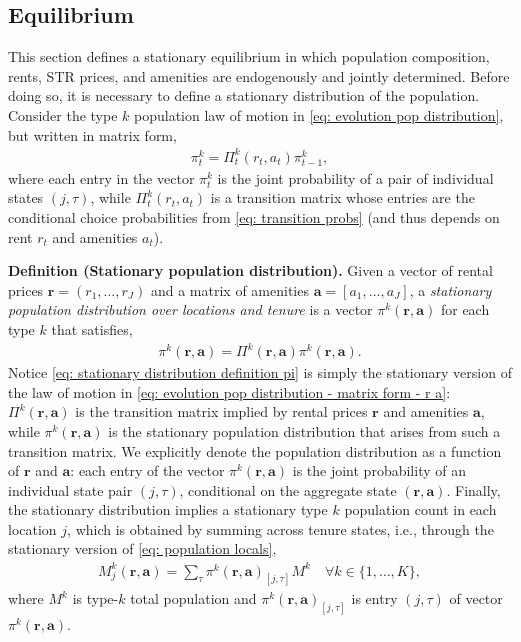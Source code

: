 \documentclass[11pt]{article}
\newcommand{\Paragraph}{\vspace{0.1cm}\noindent\textbf}
\begin{document}
\subsection{Equilibrium}\label{sec: equilibrium}

This section defines a stationary equilibrium in which population composition, rents, STR prices, and amenities are endogenously and jointly determined. Before doing so, it is necessary to define a stationary distribution of the population. Consider the type $k$ population law of motion in \ref{eq: evolution pop distribution}, but written in matrix form,
\begin{align}\label{eq: evolution pop distribution - matrix form - r a}
    \pi_{t}^k = \Pi^k_t (r_{t},a_{t}) \pi_{t-1}^k, 
\end{align}
where each entry in the vector $\pi_{t}^k$ is the joint probability of a pair of individual states $(j,\tau)$, while $\Pi^k_t (r_{t},a_{t})$ is a transition matrix whose entries are the conditional choice probabilities from \ref{eq: transition probs} (and thus depends on rent $r_t$ and amenities $a_t$).


\Paragraph{Definition (Stationary population distribution).} Given a vector of rental prices $\mathbf{r}=(r_1,\dots,r_J)$ and a matrix of amenities $\mathbf{a}=[a_1,\dots,a_J]$, a \emph{stationary population distribution over locations and tenure} is a vector $\pi^k(\mathbf{r},\mathbf{a})$ for each type $k$ that satisfies,
\begin{align}\label{eq: stationary distribution definition pi}
    \pi^k(\mathbf{r},\mathbf{a}) = \Pi^k(\mathbf{r},\mathbf{a})\pi^k(\mathbf{r},\mathbf{a}).
\end{align}
Notice \ref{eq: stationary distribution definition pi} is simply the stationary version of the law of motion in \ref{eq: evolution pop distribution - matrix form - r a}: $\Pi^k(\mathbf{r},\mathbf{a})$ is the transition matrix implied by rental prices $\mathbf{r}$ and amenities $\mathbf{a}$, while $\pi^k(\mathbf{r},\mathbf{a})$ is the stationary population distribution that arises from such a transition matrix. We explicitly denote the population distribution as a function of $\mathbf{r}$ and $\mathbf{a}$: each entry of the vector $\pi^k(\mathbf{r},\mathbf{a})$ is the joint probability of an individual state pair $(j, \tau)$, conditional on the aggregate state $(\mathbf{r},\mathbf{a})$. Finally, the stationary distribution implies a stationary type $k$ population count in each location $j$, which is obtained by summing across tenure states, i.e.,  through the stationary version of \ref{eq: population locals}, 
\begin{align}\label{eq: stationary distribution population locals}
    M^{k}_{j}(\mathbf{r},\mathbf{a}) = \sum_{\tau} \pi^k(\mathbf{r},\mathbf{a})_{[j,\tau]} M^k \quad \forall k \in \{1,\dots,K\},
\end{align}
where $M^k$ is type-$k$ total population and $\pi^k(\mathbf{r},\mathbf{a})_{[j,\tau]}$ is entry $(j,\tau)$ of vector $\pi^k(\mathbf{r},\mathbf{a})$.
\end{document}
